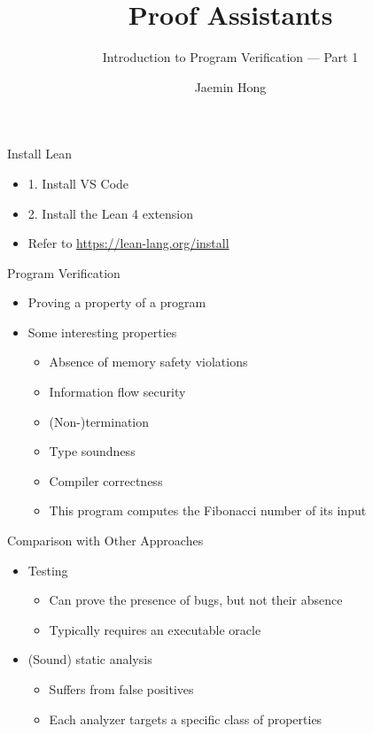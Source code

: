 \documentclass{beamer}
\title{Proof Assistants}
\subtitle{Introduction to Program Verification --- Part 1}
\author{Jaemin Hong}
\date{}
\begin{document}
\begin{frame}
  \titlepage
\end{frame}

\begin{frame}{Install Lean}
  \begin{itemize}
    \item 1. Install VS Code
    \item 2. Install the Lean 4 extension
    \item Refer to \url{https://lean-lang.org/install}
  \end{itemize}
\end{frame}

\begin{frame}{Program Verification}
  \begin{itemize}
    \item Proving a property of a program
    \item Some interesting properties
      \begin{itemize}
        \item Absence of memory safety violations
        \item Information flow security
        \item (Non-)termination
        \item Type soundness
        \item Compiler correctness
        \item This program computes the Fibonacci number of its input
      \end{itemize}
  \end{itemize}
\end{frame}

\begin{frame}{Comparison with Other Approaches}
  \begin{itemize}
    \item Testing
      \begin{itemize}
        \item Can prove the presence of bugs, but not their absence
        \item Typically requires an executable oracle
      \end{itemize}
    \item (Sound) static analysis
      \begin{itemize}
        \item Suffers from false positives
        \item Each analyzer targets a specific class of properties
      \end{itemize}
  \end{itemize}
\end{frame}
\end{document}
